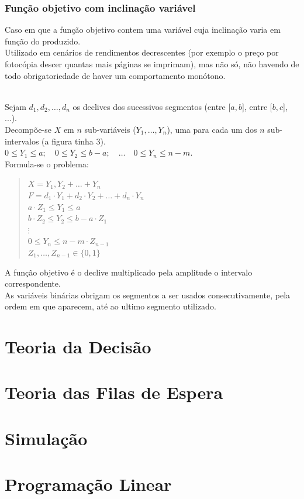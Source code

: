 \documentclass[]{report}
\begin{document}
\subsection{Função objetivo com inclinação variável}
Caso em que a função objetivo contem uma variável cuja inclinação varia em função do produzido.\\
Utilizado em cenários de rendimentos decrescentes (por exemplo o preço por fotocópia descer quantas mais páginas se imprimam), mas não só, não havendo de todo obrigatoriedade de haver um comportamento monótono.\\
\\
Sejam $d_1, d_2, \dots, d_n$ os declives dos sucessivos segmentos (entre [$a,b$], entre [$b,c$], ...).\\
Decompõe-se $X$ em $n$ sub-variáveis ($Y_1, \dots, Y_n$), uma para cada um dos $n$ sub-intervalos (a figura tinha 3).\\
$0 \leq Y_1 \leq a;\quad 0 \leq Y_2 \leq b-a;\quad \dots \quad  0 \leq Y_n \leq n-m$.\\
Formula-se o problema:
\begin{quotation}
\noindent$X = Y_1, Y_2 + \dots + Y_n$\\
$F = d_1 \cdot Y_1 + d_2 \cdot Y_2 + \dots + d_n \cdot Y_n$\\
$a \cdot Z_1 \leq Y_1 \leq a$\\
$b \cdot Z_2 \leq Y_2 \leq b-a \cdot Z_1$\\
$\vdots$\\
$0 \leq Y_n \leq n-m \cdot Z_{n-1}$\\
$Z_1, \dots, Z_{n-1} \in \{0,1\}$
\end{quotation}
A função objetivo é o declive multiplicado pela amplitude o intervalo correspondente.\\
As variáveis binárias obrigam os segmentos a ser usados consecutivamente, pela ordem em que aparecem, até ao ultimo segmento utilizado.
\chapter{Teoria da Decisão}
\chapter{Teoria das Filas de Espera}
\chapter{Simulação}
\chapter{Programação Linear}
\end{document}
